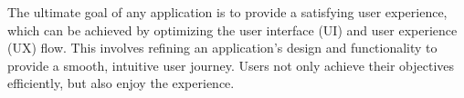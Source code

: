 
The ultimate goal of any application is to provide a satisfying user experience, which can be achieved by optimizing the 
user interface (UI) and user experience (UX) flow. This involves refining an application's design and functionality to 
provide a smooth, intuitive user journey. Users not only achieve their objectives efficiently, but also enjoy the 
experience.
